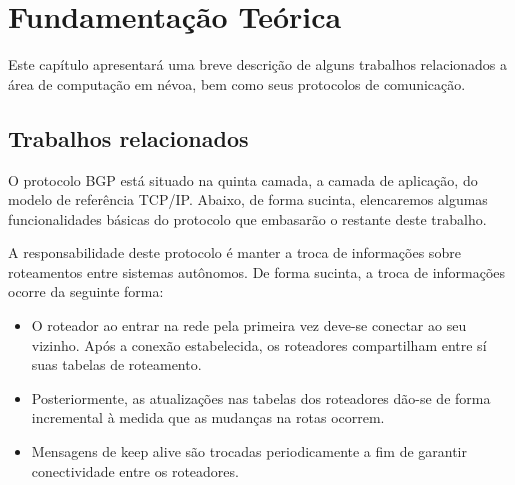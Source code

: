 \chapter{\label{chap:chap2} Fundamentação Teórica}

Este capítulo apresentará uma breve descrição de alguns trabalhos relacionados a área de computação em névoa, bem como seus protocolos de comunicação.


\section{Trabalhos relacionados}


O protocolo BGP está situado na quinta camada, a camada de aplicação, do modelo de referência TCP/IP\cite{tanenbaum2011redes}.
Abaixo, de forma sucinta, elencaremos algumas funcionalidades básicas do protocolo que embasarão o restante deste trabalho.

A responsabilidade deste protocolo é manter a troca de informações sobre roteamentos entre sistemas autônomos\cite{rfc1163}.
De forma sucinta, a troca de informações ocorre da seguinte forma: 

\begin{itemize}
    \item O roteador ao entrar na rede pela primeira vez deve-se conectar ao seu vizinho. Após a conexão estabelecida, os roteadores compartilham entre sí suas tabelas de roteamento\cite{rfc1163}.
    \item Posteriormente, as atualizações nas tabelas dos roteadores dão-se de forma incremental à medida que as mudanças na rotas ocorrem\cite{rfc1163}.
    \item Mensagens de keep alive são trocadas periodicamente a fim de garantir conectividade entre os roteadores\cite{rfc1163}.
\end{itemize}


















